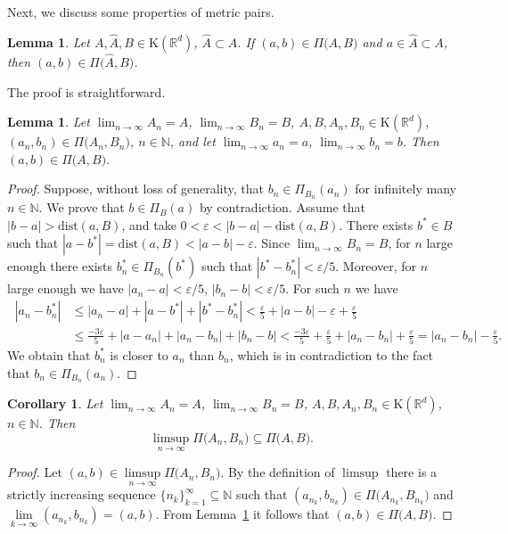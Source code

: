\documentclass[final,3p,mathptmx]{article}%
\newcommand{\R}{{\mathbb R}}
\newcommand{\N}{{\mathbb N}}
\newcommand{\Rd}{{\R}^d}
\newcommand{\Comp}{\mathrm{K}(\Rd)}
\newcommand{\dist}{\mathrm{dist}}
\newcommand{\PrjXonY}[2]{\Pi_{#2}{(#1)} }
\newcommand{\Pair}[2]{\Pi \big ( {#1},{#2} \big )}
\newtheorem{corol}[remark]{Corollary}
\newtheorem{lemma}[remark]{Lemma}
\begin{document}
{{{{Next, we discuss some properties of metric pairs.

\begin{lemma}\label{Lemma_Help} 
Let $A, \hat{A}, B \in \Comp$, $\hat{A} \subset A$. If $(a,b) \in \Pair{A}{B}$ and $a\in \hat{A} \subset A$, then $(a,b) \in \Pair{\hat{A}}{B}$.
	
\end{lemma}

The proof is straightforward.

\begin{lemma}\label{Lemma_Limit_of_MP_is_MP} 
	Let $\displaystyle \lim_{n \to \infty} A_n=A$, $\displaystyle\lim_{n \to \infty} B_n=B$, $A, B, A_n, B_n \in \Comp$, 
	$(a_n,b_n) \in \Pair{A_n}{B_n}$, $n \in \N$, and let $\lim_{n \to \infty} a_n=a$, \; $\lim_{n \to \infty} b_n=b$. 
	Then $(a,b) \in \Pair{A}{B}.$
	
\end{lemma}

\begin{proof}
	Suppose, without loss of generality, that $b_n \in \PrjXonY{a_n}{B_n}$ for infinitely many $n\in \N$. We prove that $b \in \PrjXonY{a}{B}$ by contradiction. Assume that $|b-a|> \dist (a,B)$, and take $0 < \varepsilon < |b - a| - \dist(a,B)$. There exists $b^* \in B$  such that
	${|a-b^*|=\dist(a,B)<|a-b|-\varepsilon}$. Since $\lim_{n \to \infty} B_n=B$, for $n$ large enough there exists  ${b_n^* \in \PrjXonY{b^*}{B_n}}$ such that ${|b^*-b_n^*|<\varepsilon/5}$. Moreover,  for $n$ large enough we have $|a_n - a| < \varepsilon/5$,  $|b_n - b| < \varepsilon/5$. For such $n$
	we have
	\begin{align*}\
		|a_n-b_n^*|&\le |a_n-a|+|a-b^*|+|b^*-b_n^*| < \frac{\varepsilon}{5}+|a-b|-\varepsilon+\frac{\varepsilon}{5} \\&
		\le \frac{-3\varepsilon}{5}+|a-a_n|+|a_n-b_n|+|b_n-b| 
		< \frac{-3\varepsilon}{5}+ \frac{\varepsilon}{5} + |a_n-b_n| + \frac{\varepsilon}{5}
		= | a_n-b_n|-\frac{\varepsilon}{5}.
	\end{align*}
	We obtain that $b_n^*$ is closer to $a_n$ than $b_n$,  which is in contradiction to the fact that $b_n \in \PrjXonY{a_n}{B_n}$.
\end{proof}


\begin{corol}\label{Corol_Inclusion1}
Let $\displaystyle \lim_{n \to \infty} A_n=A$, $\displaystyle \lim_{n \to \infty} B_n=B$, $A, B, A_n, B_n \in \Comp$, 
$n \in \N$. Then 
$$
\limsup_{n \to \infty} \Pair{A_n}{B_n} \subseteq \Pair{A}{B}.
$$
\end{corol}
\begin{proof}
Let $(a,b) \in \limsup\limits_{n \to \infty} \Pair{A_n}{B_n}$. By the definition of $\limsup$ there is a strictly increasing sequence $\{n_k\}_{k = 1}^\infty \subseteq \N$ such that $(a_{n_k},b_{n_k}) \in \Pair{A_{n_k}}{B_{n_k}}$ and $\lim\limits_{k \to \infty}(a_{n_k},b_{n_k})=(a,b)$.
From Lemma~\ref{Lemma_Limit_of_MP_is_MP} it follows that ${(a,b) \in \Pair{A}{B}}$.
\end{proof}


}}}}
\end{document}
